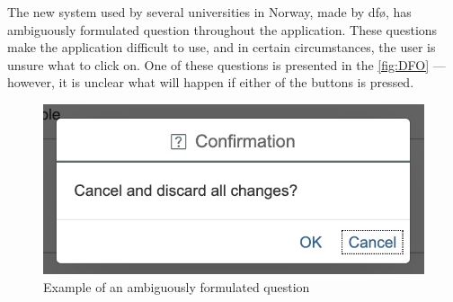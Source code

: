 The new system used by several universities in Norway, made by \gls{dfø}, has ambiguously formulated question throughout the application. These questions make the application difficult to use, and in certain circumstances, the user is unsure what to click on. One of these questions is presented in the \autoref{fig:DFO} --- however, it is unclear what will happen if either of the buttons is pressed.

\begin{figure}
    \centering
    \includegraphics[scale=0.55, frame]{figures/DFO.jpg}
    \caption{Example of an ambiguously formulated question}
    \label{fig:DFO}
\end{figure}

